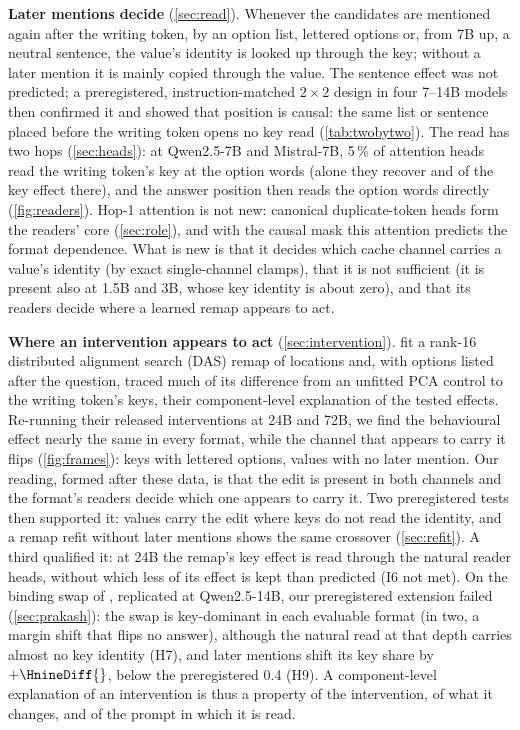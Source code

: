 \textbf{Later mentions decide} (\cref{sec:read}). Whenever the candidates are mentioned again after the writing token, by an option list, lettered options or, from 7B up, a neutral sentence, the value's identity is looked up through the key; without a later mention it is mainly copied through the value. The sentence effect was not predicted; a preregistered, instruction-matched $2{\times}2$ design in four 7--14B models then confirmed it and showed that position is causal: the same list or sentence placed before the writing token opens no key read (\cref{tab:twobytwo}). The read has two hops (\cref{sec:heads}): at Qwen2.5-7B and Mistral-7B, 5\,\% of attention heads read the writing token's key at the option words (alone they recover \HoneRQwenSeven{} and \HoneRMistralSeven{} of the key effect there), and the answer position then reads the option words directly (\cref{fig:readers}). Hop-1 attention is not new: canonical duplicate-token heads \citep{wang2022ioi} form the readers' core (\cref{sec:role}), and with the causal mask this attention predicts the format dependence. What is new is that it decides which cache channel carries a value's identity (by exact single-channel clamps), that it is not sufficient (it is present also at 1.5B and 3B, whose \fmtPost{} key identity is about zero), and that its readers decide where a learned remap appears to act.

\textbf{Where an intervention appears to act} (\cref{sec:intervention}). \citet{anonymous2026fitted} fit a rank-16 distributed alignment search (DAS) remap of locations \citep{geiger2024finding} and, with options listed after the question, traced much of its difference from an unfitted PCA control to the writing token's keys, their component-level explanation of the tested effects. Re-running their released interventions at 24B and 72B, we find the behavioural effect nearly the same in every format, while the channel that appears to carry it flips (\cref{fig:frames}): keys with lettered options, values with no later mention. Our reading, formed after these data, is that the edit is present in both channels and the format's readers decide which one appears to carry it. Two preregistered tests then supported it: values carry the edit where keys do not read the identity, and a remap refit without later mentions shows the same crossover (\cref{sec:refit}). A third qualified it: at 24B the remap's key effect is read through the natural reader heads, without which less of its effect is kept than predicted (I6 not met). On the binding swap of \citet{prakash2025lookbacks}, replicated at Qwen2.5-14B, our preregistered extension failed (\cref{sec:prakash}): the swap is key-dominant in each evaluable format (in two, a margin shift that flips no answer), although the natural read at that depth carries almost no key identity (H7), and later mentions shift its key share by $+\HnineDiff{}$, below the preregistered 0.4 (H9). A component-level explanation of an intervention is thus a property of the intervention, of what it changes, and of the prompt in which it is read.


